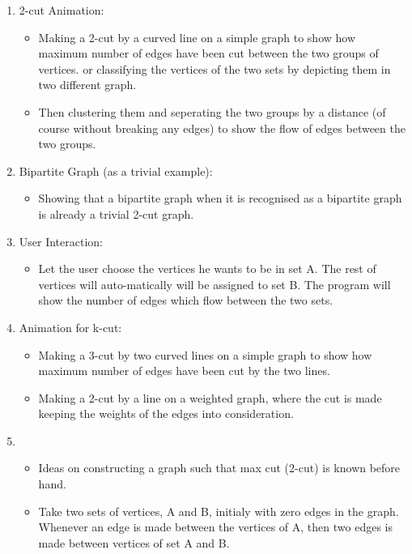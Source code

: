 \begin{enumerate}
\def\labelenumi{\arabic{enumi}.}
\item
  2-cut Animation:

  \begin{itemize}
  \tightlist
  \item
    Making a 2-cut by a curved line on a simple graph to show how
    maximum number of edges have been cut between the two groups of
    vertices. or classifying the vertices of the two sets by depicting
    them in two different graph.
  \item
    Then clustering them and seperating the two groups by a distance (of
    course without breaking any edges) to show the flow of edges between
    the two groups.
  \end{itemize}
\item
  Bipartite Graph (as a trivial example):

  \begin{itemize}
  \tightlist
  \item
    Showing that a bipartite graph when it is recognised as a bipartite
    graph is already a trivial 2-cut graph.
  \end{itemize}
\item
  User Interaction:

  \begin{itemize}
  \tightlist
  \item
    Let the user choose the vertices he wants to be in set A. The rest
    of vertices will auto-matically will be assigned to set B. The
    program will show the number of edges which flow between the two
    sets.
  \end{itemize}
\item
  Animation for k-cut:

  \begin{itemize}
  \tightlist
  \item
    Making a 3-cut by two curved lines on a simple graph to show how
    maximum number of edges have been cut by the two lines.
  \item
    Making a 2-cut by a line on a weighted graph, where the cut is made
    keeping the weights of the edges into consideration.
  \end{itemize}
\item
  \begin{itemize}
  \tightlist
  \item
    Ideas on constructing a graph such that max cut (2-cut) is known
    before hand.
  \item
    Take two sets of vertices, A and B, initialy with zero edges in the
    graph. Whenever an edge is made between the vertices of A, then two
    edges is made between vertices of set A and B.
  \end{itemize}
\end{enumerate}

